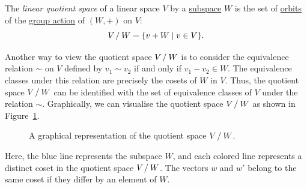 \begin{definition}\label{def:quotient_space}
  The \emph{linear quotient space} of a linear space $V$ by a \hyperref[def:linear_subspace]{subspace} $W$ is the set of \hyperref[def:orbits]{orbits} of the \hyperref[def:group_action]{group action} of $(W, +)$ on $V$:
  \[
    V \mathbin{/} W = \{ v + W \mid v \in V \}.
  \]
\end{definition}

Another way to view the quotient space $V \mathbin{/} W$ is to consider the equivalence relation $\sim$ on $V$ defined by $v_1 \sim v_2$ if and only if $v_1 - v_2 \in W$. The equivalence classes under this relation are precisely the cosets of $W$ in $V$. Thus, the quotient space $V \mathbin{/} W$ can be identified with the set of equivalence classes of $V$ under the relation $\sim$. Graphically, we can visualise the quotient space $V \mathbin{/} W$ as shown in Figure~\ref{fig:quotient_space}.
\begin{figure}[ht!]
  \centering
  \caption{A graphical representation of the quotient space $V \mathbin{/} W$.}\label{fig:quotient_space}
\end{figure}
Here, the blue line represents the subspace $W$, and each colored line represents a distinct coset in the quotient space $V \mathbin{/} W$. The vectors $w$ and $w'$ belong to the same coset if they differ by an element of $W$.

